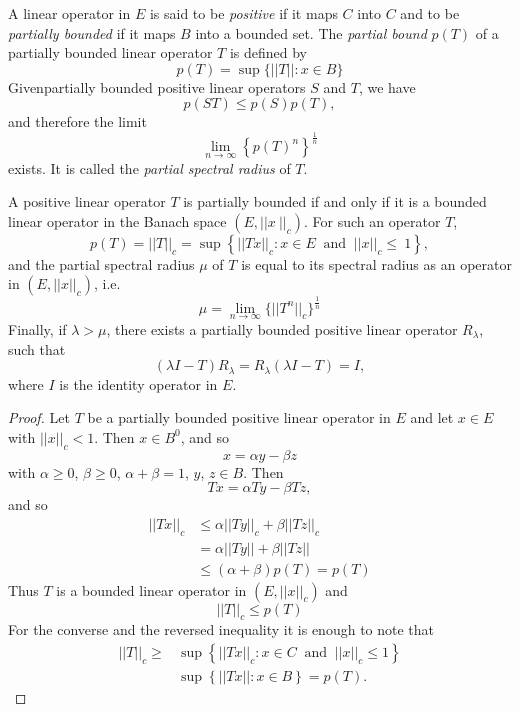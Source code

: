 \begin{Definition}%
  A linear operator in $E$ is said to be {\em positive } if it maps
  $C$ into $C$ and to be {\em partially bounded } if it maps $B$ into
  a bounded set. The {\em partial bound } $p(T)$ of a partially
  bounded linear operator $T$ is defined by 
  $$
  p(T) = \sup \{ || T || : x \in B\}
  $$
  Given\pageoriginale partially bounded positive linear operators $S$
  and $T$, we have 
  $$
  p(ST) \leq p(S) p(T),
  $$
  and therefore the limit
  $$
  \lim _{n \to \infty} \left\{ p(T)^n \right\}^{\frac{1}{n}}
  $$
  exists. It is called the \textit{ partial spectral radius } of $T$.
\end{Definition}

\begin{lemma} %
  A positive linear operator $T$ is partially bounded if and only if
  it is a bounded linear operator in the Banach space $(E, ||
  x\ ||_c)$. For such an operator $T$, 
  $$
  p(T) = || T ||_c = \sup \left\{ || Tx ||_c : x \in E ~ \text{ and }
  ~ || x ||_c \leq ~ 1 \right\}, 
  $$
  and the partial spectral radius $\mu$ of $T$ is equal to its
  spectral radius as an operator in $(E, || x ||_c)$, i.e. 
  $$
  \mu = \lim_{n \to \infty} \{|| T^n ||_c\}^{\frac{1}{n}}
  $$
  Finally, if $\lambda > \mu$, there exists a partially bounded
  positive linear operator $R_\lambda$, such that 
  $$
  (\lambda I - T) R_ \lambda = R_ \lambda (\lambda I - T) = I,
  $$
  where $I$ is the identity operator in $E$.
\end{lemma}

\begin{proof}
  Let $T$ be a partially bounded positive linear operator in $E	$ and
  let $x \in E$ with $|| x ||_c < 1$. Then $x \in B^0$, and so  
  $$
 x = \alpha y - \beta z
$$\pageoriginale
with $\alpha \geq 0$, $\beta \geq 0$, $\alpha + \beta = 1$,
    $y$, $z \in B$. Then 
  $$
  Tx = \alpha Ty - \beta Tz,
  $$
  and so 
  \begin{align*}
    || Tx ||_c & \leq \alpha || Ty ||_c + \beta ||Tz||_c\\
    & = \alpha ||Ty || + \beta ||Tz || \\
    & \leq (\alpha+ \beta) p(T) = p(T)
  \end{align*}
  Thus $T$ is a bounded linear operator in $(E, ||x ||_c)$ and
  $$
  || T ||_c \leq p(T)
  $$
  For the converse and the reversed inequality it is enough to note that 
  \begin{align*}
    ||T||_c \geq  & \sup \left\{ ||Tx ||_c : x \in C ~ \text{ and } ~
    ||x ||_c \leq 1 \right\}\\ 
    & \sup \left\{ || Tx || : x \in B \right\} = p(T).
  \end{align*}
\end{proof}


